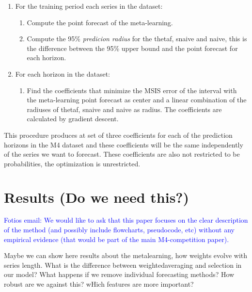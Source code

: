 \documentclass[11pt,a4paper,]{article}
\providecommand{\tightlist}{%
  \setlength{\itemsep}{0pt}\setlength{\parskip}{0pt}}
\theoremstyle{definition}
\theoremstyle{definition}
\theoremstyle{definition}
\theoremstyle{remark}
\begin{document}
\begin{enumerate}
\def\labelenumi{\arabic{enumi}.}
\tightlist
\item
  For the training period each series in the dataset:

  \begin{enumerate}
  \def\labelenumii{\arabic{enumii}.}
  \tightlist
  \item
    Compute the point forecast of the meta-learning.
  \item
    Compute the 95\% \emph{predicion radius} for the thetaf, snaive and
    naive, this is the difference between the 95\% upper bound and the
    point forecast for each horizon.
  \end{enumerate}
\item
  For each horizon in the dataset:

  \begin{enumerate}
  \def\labelenumii{\arabic{enumii}.}
  \tightlist
  \item
    Find the coefficients that minimize the MSIS error of the interval
    with the meta-learning point forecast as center and a linear
    combination of the radiuses of thetaf, snaive and naive as radius.
    The coefficients are calculated by gradient descent.
  \end{enumerate}
\end{enumerate}

This procedure produces at set of three coefficients for each of the
prediction horizons in the M4 dataset and these coefficients will be the
same independently of the series we want to forecast. These coefficients
are also not restricted to be probabilities, the optimization is
unrestricted.

\section{Results (Do we need this?)}\label{results-do-we-need-this}

\textcolor{blue}{ Fotios email: We would like to ask that this paper focuses on the clear description of the method (and possibly include flowcharts, pseudocode, etc) without any empirical evidence (that would be part of the main M4-competition paper). }

Maybe we can show here results about the metalearning, how weights
evolve with series length. What is the difference between
weightedaveraging and selection in our model? What happens if we remove
individual forecasting methods? How robust are we against this? wHich
features are more important?
\end{document}
